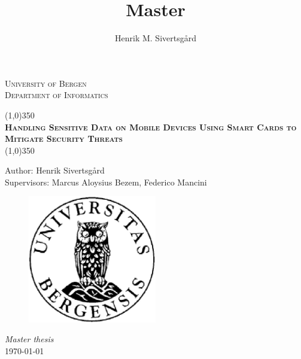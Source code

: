 \documentclass[11pt]{report}
\title{Master}
\author{Henrik M. Sivertsgård}
\newenvironment{bottompar}{\par\vspace*{\fill}}{\clearpage}
\begin{document}
  \begin{titlepage}
    \begin{center}
      \textsc{\LARGE University of Bergen\\}
      \textsc{\LARGE Department of Informatics\\[1cm]}


      \line(1,0){350}
      \\[1cm]

      \textsc{\huge \textbf{Handling Sensitive Data on Mobile Devices Using Smart Cards to Mitigate Security Threats}}
      \\[0.6cm]
      \line(1,0){350}
    \end{center}
    \begin{center}
      Author: Henrik Sivertsgård
      \\[0.2cm]
      Supervisors: Marcus Aloysius Bezem, Federico Mancini
      \\[0.2cm]
    \end{center}
    \begin{bottompar}
      \begin{figure}[h!]
        \label{fig:uiblogo}
        \centering
          \includegraphics[width=0.50\textwidth]{images/uib-logo.eps}
      \end{figure}
      \begin{center}
        \textit{Master thesis\\}
        \today
      \end{center}
    \end{bottompar}

  \end{titlepage}



  \newpage
  \tableofcontents

  \listoffigures

  \listoftables

  \lstlistoflistings


\cleardoublepage{}
  
  
  
  
  
  
  

  \printbibliography

  
\end{document}
